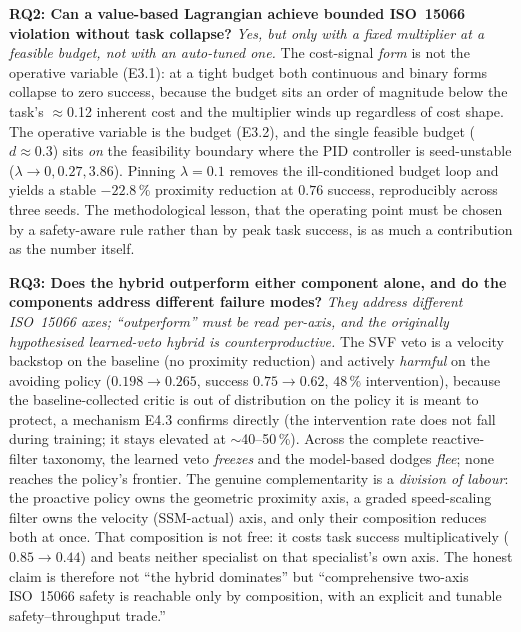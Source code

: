 \documentclass[11pt,a4paper]{report}
\newcommand{\ssm}{SSM}
\newcommand{\iso}{ISO~15066}
\begin{document}
\textbf{RQ2: Can a value-based Lagrangian achieve bounded \iso{}
violation without task collapse?} \emph{Yes, but only with a fixed
multiplier at a feasible budget, not with an auto-tuned one.} The
cost-signal \emph{form} is not the operative variable (E3.1): at a
tight budget both continuous and binary forms collapse to zero
success, because the budget sits an order of magnitude below the
task's $\approx$0.12 inherent cost and the multiplier winds up
regardless of cost shape. The operative variable is the budget (E3.2),
and the single feasible budget ($d \approx 0.3$) sits \emph{on} the
feasibility boundary where the PID controller is seed-unstable
($\lambda \to 0, 0.27, 3.86$). Pinning $\lambda = 0.1$ removes the
ill-conditioned budget loop and yields a stable $-22.8\,\%$ proximity
reduction at $0.76$ success, reproducibly across three seeds. The
methodological lesson, that the operating point must be chosen by a
safety-aware rule rather than by peak task success, is as much a
contribution as the number itself.

\textbf{RQ3: Does the hybrid outperform either component alone, and do
the components address different failure modes?} \emph{They address
different \iso{} axes; ``outperform'' must be read per-axis, and the
originally hypothesised learned-veto hybrid is counterproductive.} The
SVF veto is a velocity backstop on the baseline (no proximity
reduction) and actively \emph{harmful} on the avoiding policy
($0.198 \to 0.265$, success $0.75 \to 0.62$, $48\,\%$ intervention),
because the baseline-collected critic is out of distribution on the
policy it is meant to protect, a mechanism E4.3 confirms directly (the
intervention rate does not fall during training; it stays elevated at
$\sim$40--50\,\%). Across the complete reactive-filter taxonomy, the
learned veto \emph{freezes} and the model-based dodges \emph{flee};
none reaches the policy's frontier. The genuine complementarity is a
\emph{division of labour}: the proactive policy owns the geometric
proximity axis, a graded speed-scaling filter owns the velocity
(\ssm{}-actual) axis, and only their composition reduces both at once.
That composition is not free: it costs task success multiplicatively
($0.85 \to 0.44$) and beats neither specialist on that specialist's
own axis. The honest claim is therefore not ``the hybrid dominates''
but ``comprehensive two-axis \iso{} safety is reachable only by
composition, with an explicit and tunable safety--throughput trade.''
\end{document}
